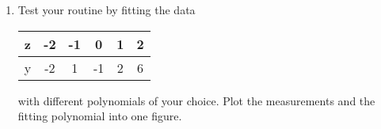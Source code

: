 \begin{enumerate}
\begin{enumerate}
	\end{enumerate}
	\item Test your routine by fitting the data 
	\begin{center}
		\begin{tabular}{l|c c c c c}
			z&-2&-1&0&1&2\\
			\hline
			y&-2&1&-1&2&6
		\end{tabular}
	\end{center}
with different polynomials of your choice. Plot the measurements and the fitting polynomial into one figure.
\end{enumerate}
